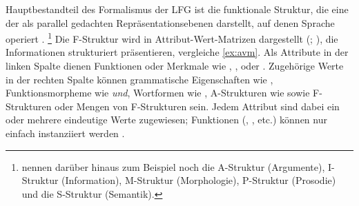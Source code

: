 Hauptbestandteil des Formalismus der LFG ist die funktionale Struktur, die eine
der als parallel gedachten Repräsentationsebenen darstellt, auf denen Sprache
operiert \autocite[840--844]{buttking2015}.%
%
	\footnote{\citet[862--865]{buttking2015} nennen darüber hinaus zum Beispiel
		noch die
		A-Struktur (Argumente),
		I-Struktur (Information),
		M-Struktur (Morphologie),
		P-Struktur (Prosodie)
		und die
		S-Struktur (Semantik).
	}
%
Die F-Struktur wird in Attribut-Wert-Matrizen dargestellt (; \cites[vgl.][44--45]{bresnanetal2016}[Kap.~6]{mueller2020}), die
Informationen strukturiert präsentieren, vergleiche \cref{ex:avm}. Als
Attribute in der linken Spalte dienen Funktionen oder Merkmale wie
, , oder .
Zugehörige Werte in der rechten Spalte können grammatische Eigenschaften wie
, Funktionsmorpheme wie \textit{und}, Wortformen wie
, A-Strukturen wie  sowie F-Strukturen oder Mengen von F-Strukturen sein. Jedem
Attribut sind dabei ein oder mehrere eindeutige Werte zugewiesen; Funktionen
(, , etc.) können nur einfach
instanziiert werden \autocite[vgl.][44--58]{bresnanetal2016}.

